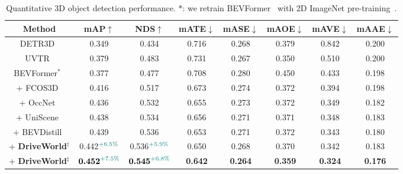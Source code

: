 \begin{table}[t]
	\centering
	\resizebox{0.5\textwidth}{!}
	{
		{
			\begin{tabular}{c|c|c|c|c|c|c|c}
				\toprule
				\textbf{Method} &\textbf{mAP}$\uparrow$&\textbf{NDS}$\uparrow$&\textbf{mATE}$\downarrow$&\textbf{mASE}$\downarrow$&\textbf{mAOE}$\downarrow$&\textbf{mAVE}$\downarrow$&\textbf{mAAE}$\downarrow$ \\
				\midrule
				DETR3D~\cite{detr3d} &0.349&0.434&0.716&0.268&0.379&0.842&0.200\\
				UVTR~\cite{uvtr}&0.379 &0.483 &0.731 &0.267 &0.350 &0.510 &0.200\\
				\midrule
				BEVFormer$^{*}$~\cite{bevformer} &0.377&0.477&0.708&0.280&0.450&0.433&0.198\\
				+ FCOS3D~\cite{fcos3d} &0.416&0.517&0.673&0.274&0.372&0.394&0.198\\
				+ OccNet~\cite{occnet} &0.436&0.532&0.655&0.273 &0.372 &0.349 &0.182\\
				+ UniScene~\cite{uniscene} &0.438&0.534&0.656&0.271 &0.371 &0.348 &0.183\\
				+ BEVDistill~\cite{bevdistill} &0.439&0.536&0.653&0.271 &0.372 &0.343 &0.180\\
				\midrule
				\rowcolor{gray!10}+ \textbf{DriveWorld}$^{\dagger }$ &0.442$^{\textcolor{teal} {+6.5\%}}$&0.536$^{\textcolor{teal}{+5.9\%}}$&0.650&0.268 &0.370 &0.342 &0.183 \\
				\rowcolor{gray!10}+ \textbf{DriveWorld}$^{\ddagger }$ &$\textbf{0.452}^{\textcolor{teal} {+7.5\%}}$&$\textbf{0.545}^{\textcolor{teal} {+6.8\%}}$&\textbf{0.642}&\textbf{0.264}&\textbf{0.359}&\textbf{0.324}&\textbf{0.176}\\
				
				\bottomrule
			\end{tabular}
	}}
	\caption{Quantitative 3D object detection performance. ${*}$: we retrain BEVFormer~\cite{bevformer} with 2D ImageNet pre-training~\cite{resnet}.}
	\label{tab:detection}
\end{table}

